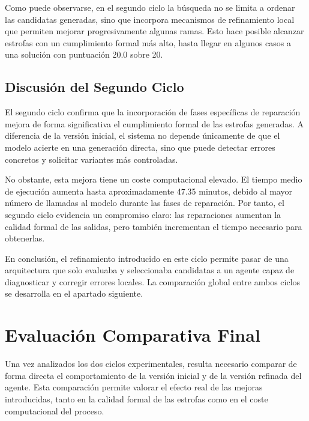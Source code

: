 \documentclass[12pt,a4paper,twoside,openright]{book}
\begin{document}
Como puede observarse, en el segundo ciclo la búsqueda no se limita a ordenar las candidatas generadas, sino que incorpora mecanismos de refinamiento local que permiten mejorar progresivamente algunas ramas.
Esto hace posible alcanzar estrofas con un cumplimiento formal más alto, hasta llegar en algunos casos a una solución con puntuación 20.0 sobre 20.


\subsection{Discusión del Segundo Ciclo}

El segundo ciclo confirma que la incorporación de fases específicas de reparación mejora de forma significativa el cumplimiento formal de las estrofas generadas.
A diferencia de la versión inicial, el sistema no depende únicamente de que el modelo acierte en una generación directa, sino que puede detectar errores concretos y solicitar variantes más controladas.

No obstante, esta mejora tiene un coste computacional elevado. El tiempo medio de ejecución aumenta hasta aproximadamente 47.35 minutos, debido al mayor número de llamadas al modelo durante las fases de reparación.
Por tanto, el segundo ciclo evidencia un compromiso claro: las reparaciones aumentan la calidad formal de las salidas, pero también incrementan el tiempo necesario para obtenerlas.

En conclusión, el refinamiento introducido en este ciclo permite pasar de una arquitectura que solo evaluaba y seleccionaba candidatas a un agente capaz de diagnosticar y corregir errores locales. La comparación global entre ambos ciclos se desarrolla en el apartado siguiente.


\section{Evaluación Comparativa Final} %

Una vez analizados los dos ciclos experimentales, resulta necesario comparar de forma directa el comportamiento de la versión inicial y de la versión refinada del agente.
Esta comparación permite valorar el efecto real de las mejoras introducidas, tanto en la calidad formal de las estrofas como en el coste computacional del proceso.
\end{document}
